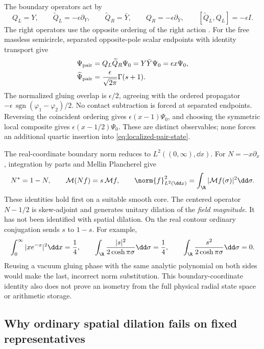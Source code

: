 The boundary operators act by
\begin{equation}\label{eq:localized-operators}
 Q_L=Y,\qquad \widetilde Q_L=-\epsilon\partial_Y,\qquad
 \widetilde Q_R=\bar Y,\qquad Q_R=-\epsilon\partial_{\bar Y},
 \qquad [\widetilde Q_L,Q_L]=-\epsilon I.
\end{equation}
The right operators use the opposite ordering of the right action
\cite[equations~(125)--(126)]{DedushenkoGluing}.
For the free massless semicircle, separated opposite-pole scalar
endpoints with identity transport give
\begin{align}
 \Psi_{\rm pair}
 &=Q_L\widetilde Q_R\Psi_0
   =Y\bar Y\Psi_0=\epsilon x\Psi_0,
 \label{eq:localized-pair-state}\\
 \widehat\Psi_{\rm pair}
 &=\frac{\epsilon}{\sqrt{2\pi}}\Gamma(s+1).
 \label{eq:localized-pair-gamma}
\end{align}
The normalized gluing overlap is $\epsilon/2$, agreeing with the
ordered propagator
$-\epsilon\,\operatorname{sgn}(\varphi_1-\varphi_2)/2$.
No contact subtraction is forced at separated endpoints. Reversing
the coincident ordering gives $\epsilon(x-1)\Psi_0$, and choosing
the symmetric local composite gives $\epsilon(x-1/2)\Psi_0$.
These are distinct observables; none forces an additional quartic
insertion into \eqref{eq:localized-pair-state}.

The real-coordinate boundary norm reduces to $L^2((0,\infty),\dd x)$.
For $N=-x\partial_x$, integration by parts and Mellin Plancherel give
\begin{equation}\label{eq:localized-field-adjoint}
 N^*=1-N,\qquad
 \mathcal M(Nf)=s\,\mathcal Mf,\qquad
 \norm{f}_{L^2(\dd x)}^2
 =\int_{\R}|\mathcal Mf(\sigma)|^2\dd\sigma.
\end{equation}
These identities hold first on a suitable smooth core. The centered
operator $N-1/2$ is skew-adjoint and generates unitary dilation of
the \emph{field magnitude}. It has not been identified with spatial
dilation. On the real contour ordinary conjugation sends $s$ to
$1-s$. For example,
\[
 \int_0^\infty |xe^{-x}|^2\dd x=\frac14,\qquad
 \int_{\R}\frac{|s|^2}{2\cosh\pi\sigma}\dd\sigma=\frac14,
 \qquad
 \int_{\R}\frac{s^2}{2\cosh\pi\sigma}\dd\sigma=0.
\]
Reusing a vacuum gluing phase with the same analytic polynomial on
both sides would make the last, incorrect norm substitution.
This boundary-coordinate identity also does not prove an isometry
from the full physical radial state space or arithmetic storage.

\subsection{Why ordinary spatial dilation fails on fixed representatives}
\label{subsec:localized-nondescent}

